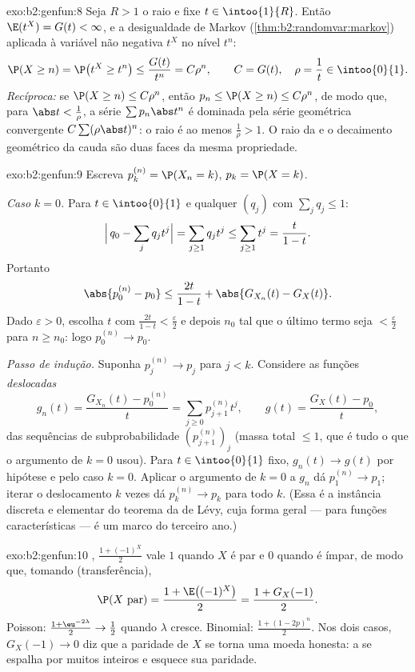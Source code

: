 \begin{solution}{exo:b2:genfun:8}
Seja $R > 1$ o raio e fixe $t \in \intoo{1}{R}$. Então
$\E(t^X) = G(t) < \infty$, e a desigualdade de Markov
(\cref{thm:b2:randomvar:markov}) aplicada à variável não negativa
$t^X$ no nível $t^n$:
\[
\P(X \geq n) = \P\bigl(t^X \geq t^n\bigr)
\leq \frac{G(t)}{t^n} = C\rho^n,
\qquad C = G(t),\quad \rho = \frac1t \in \intoo{0}{1}.
\]
\emph{Recíproca:} se $\P(X \geq n) \leq C\rho^n$, então $p_n \leq
\P(X \geq n) \leq C\rho^n$, de modo que, para $\abs t < \frac1\rho$, a
série $\sum p_n\abs t^n$ é dominada pela série geométrica convergente
$C\sum(\rho\abs t)^n$: o raio é ao menos
$\frac1\rho > 1$. O raio da  e o decaimento
geométrico da cauda são duas faces da mesma propriedade.
\end{solution}

\begin{solution}{exo:b2:genfun:9}
Escreva $p_k^{(n)} = \P(X_n = k)$, $p_k = \P(X = k)$.

\emph{Caso $k = 0$.} Para $t \in \intoo{0}{1}$ e qualquer 
$(q_j)$ com $\sum_j q_j \leq 1$:
\[
\Bigl|\,q_0 - \sum_j q_jt^j\Bigr|
= \sum_{j \geq 1} q_j t^j
\leq \sum_{j\geq1}t^j = \frac{t}{1 - t} .
\]
Portanto
\[
\abs{p_0^{(n)} - p_0}
\leq \frac{2t}{1 - t}
+ \abs{G_{X_n}(t) - G_X(t)} .
\]
Dado $\varepsilon > 0$, escolha $t$ com $\frac{2t}{1-t} <
\frac\varepsilon2$ e depois $n_0$ tal que o último termo seja $<
\frac\varepsilon2$ para $n \geq n_0$: logo $p_0^{(n)} \to p_0$.

\emph{Passo de indução.} Suponha $p_j^{(n)} \to p_j$ para $j < k$.
Considere as funções \emph{deslocadas}
\[
g_n(t) = \frac{G_{X_n}(t) - p^{(n)}_0}{t}
= \sum_{j\geq0} p^{(n)}_{j+1}t^j,
\qquad
g(t) = \frac{G_X(t) - p_0}{t} ,
\]
 das sequências de subprobabilidade
$(p^{(n)}_{j+1})_j$ (massa total $\leq 1$, que é tudo o que o
argumento de $k = 0$ usou). Para $t \in \intoo{0}{1}$ fixo, $g_n(t)
\to g(t)$ por hipótese e pelo caso $k = 0$. Aplicar o argumento de $k =
0$ a $g_n$ dá $p_1^{(n)} \to p_1$; iterar o
deslocamento $k$ vezes dá $p_k^{(n)} \to p_k$ para todo $k$. (Essa é
a instância discreta e elementar do teorema da  de Lévy,
cuja forma geral --- para funções características --- é um marco do
terceiro ano.)
\end{solution}

\begin{solution}{exo:b2:genfun:10}
, $\frac{1 + (-1)^X}{2}$ vale $1$ quando $X$ é par
e $0$ quando é ímpar, de modo que, tomando  (transferência),
\[
\P(X \text{ par}) = \frac{1 + \E\bigl((-1)^X\bigr)}2 =
\frac{1 + G_X(-1)}2 .
\]
Poisson: $\frac{1 + \eu^{-2\lambda}}2 \to \frac12$ quando
$\lambda$ cresce. Binomial: $\frac{1 + (1 - 2p)^n}2$. Nos dois
casos, $G_X(-1) \to 0$ diz que a paridade de $X$ se torna uma
moeda honesta: a  se espalha por muitos inteiros e esquece sua
paridade.
\end{solution}

